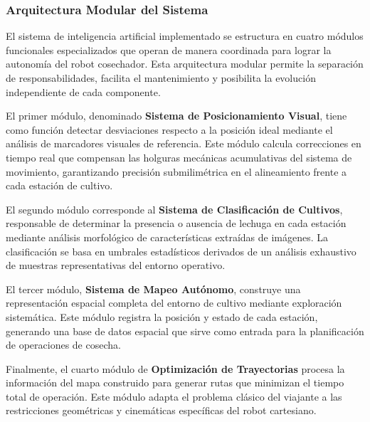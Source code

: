 \subsubsection{Arquitectura Modular del Sistema}

El sistema de inteligencia artificial implementado se estructura en cuatro módulos funcionales especializados que operan de manera coordinada para lograr la autonomía del robot cosechador. Esta arquitectura modular permite la separación de responsabilidades, facilita el mantenimiento y posibilita la evolución independiente de cada componente.

El primer módulo, denominado \textbf{Sistema de Posicionamiento Visual}, tiene como función detectar desviaciones respecto a la posición ideal mediante el análisis de marcadores visuales de referencia. Este módulo calcula correcciones en tiempo real que compensan las holguras mecánicas acumulativas del sistema de movimiento, garantizando precisión submilimétrica en el alineamiento frente a cada estación de cultivo.

El segundo módulo corresponde al \textbf{Sistema de Clasificación de Cultivos}, responsable de determinar la presencia o ausencia de lechuga en cada estación mediante análisis morfológico de características extraídas de imágenes. La clasificación se basa en umbrales estadísticos derivados de un análisis exhaustivo de muestras representativas del entorno operativo.

El tercer módulo, \textbf{Sistema de Mapeo Autónomo}, construye una representación espacial completa del entorno de cultivo mediante exploración sistemática. Este módulo registra la posición y estado de cada estación, generando una base de datos espacial que sirve como entrada para la planificación de operaciones de cosecha.

Finalmente, el cuarto módulo de \textbf{Optimización de Trayectorias} procesa la información del mapa construido para generar rutas que minimizan el tiempo total de operación. Este módulo adapta el problema clásico del viajante a las restricciones geométricas y cinemáticas específicas del robot cartesiano.

